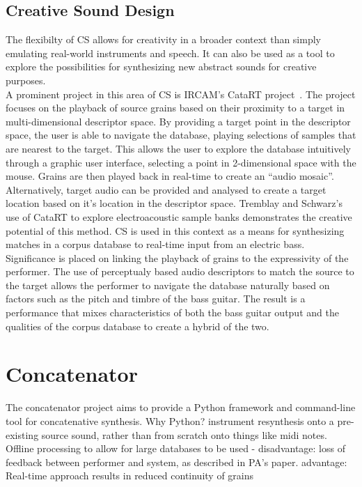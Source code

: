 \documentclass{scrartcl}
\begin{document}
    \subsection*{Creative Sound Design}
    The flexibilty of CS allows for creativity in a broader context than simply
    emulating real-world instruments and speech. It can also be used as a tool
    to explore the possibilities for synthesizing new abstract sounds for
    creative purposes.\\
    A prominent project in this area of CS is IRCAM's CataRT
    project~\parencite{Schwarz2006}. The project focuses on the playback of
    source grains based on their proximity to a target in multi-dimensional
    descriptor space.  By providing a target point in the descriptor space, the
    user is able to navigate the database, playing selections of samples that
    are nearest to the target. This allows the user to explore the database
    intuitively through a graphic user interface, selecting a point in
    2-dimensional space with the mouse. Grains are then played back in
    real-time to create an ``audio mosaic''.\\
    Alternatively, target audio can be provided and analysed to create a target
    location based on it's location in the descriptor space.  Tremblay and
    Schwarz's~\citeyearpar{Tremblay2010} use of CataRT to explore
    electroacoustic sample banks demonstrates the creative potential of this
    method. CS is used in this context as a means for synthesizing matches in a
    corpus database to real-time input from an electric bass.  Significance is
    placed on linking the playback of grains to the expressivity of the
    performer. The use of perceptualy based audio descriptors to match the
    source to the target allows the performer to navigate the database
    naturally based on factors such as the pitch and timbre of the bass
    guitar. The result is a performance that mixes characteristics of both the
    bass guitar output and the qualities of the corpus database to create a
    hybrid of the two.

    \section{Concatenator}
    The concatenator project aims to provide a Python framework and
    command-line tool for concatenative synthesis.
    Why Python?
    instrument resynthesis onto a pre-existing source sound, rather than from scratch onto things like midi notes.
    Offline processing to allow for large databases to be used - disadvantage: loss of feedback between performer and system, as described in PA's paper.
    advantage: Real-time approach results in reduced continuity of grains
\end{document}
